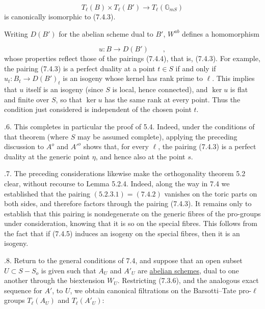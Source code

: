 \begin{equation}\tag{7.4.4}
T_{\ell}(B) \times T_{\ell}(B')
 \longrightarrow T_{\ell}(\mathbb G_{mS})
\end{equation}
is canonically isomorphic to (7.4.3).

Writing $D(B')$ for the abelian scheme dual to $B'$, $W^{ab}$ defines
a homomorphism

\begin{equation}\tag{7.4.5}
u:B\longrightarrow D(B') \qquad ,
\end{equation}
whose properties reflect those of the pairings (7.4.4), that is,
(7.4.3). For example, the pairing (7.4.3) is a perfect duality at a
point $t\in S$ if and only if
$u_t:B_t\longrightarrow D(B')_t$ is an isogeny whose kernel has rank
prime to $\ell$. This implies that $u$ itself is an isogeny (since
$S$ is local, hence connected), and $\ker u$ is flat and finite over
$S$, so that $\ker u$ has the same rank at every point. Thus the
condition just considered is independent of the chosen point $t$.

\medskip
{}.6. This completes in particular the proof of 5.4. Indeed, under
the conditions of that theorem (where $S$ may be assumed complete),
applying the preceding discussion to $A^o$ and ${A'}^o$ shows that,
for every $\ell$, the pairing (7.4.3) is a perfect duality at the
generic point $\eta$, and hence also at the point $s$.

\medskip
{}.7. The preceding considerations likewise make the orthogonality
theorem 5.2 clear, without recourse to Lemma 5.2.4. Indeed, along the
way in 7.4 we established that the pairing
$(5.2.3.1)=(7.4.2)$ vanishes on the toric parts on both sides, and
therefore factors through the pairing (7.4.3). It remains only to
establish that this pairing is nondegenerate on the generic fibres of
the pro-groups under consideration, knowing that it is so on the
special fibres. This follows from the fact that if (7.4.5) induces an
isogeny on the special fibres, then it is an isogeny.

\medskip
{}.8. Return to the general conditions of 7.4, and suppose that an
open subset $U\subset S-S_o$ is given such that $A_U$ and $A'_U$ are
\underline{abelian schemes}, dual to one another through the
biextension $W_U$. Restricting (7.3.6), and the analogous exact
sequence for $A'$, to $U$, we obtain canonical filtrations on the
Barsotti--Tate pro-$\ell$ groups $T_\ell(A_U)$ and $T_\ell(A'_U)$:

